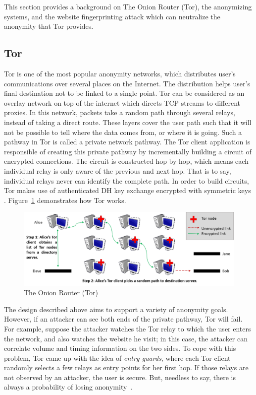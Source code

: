 
This section provides a background on The Onion Router (Tor), the anonymizing systems, and the website fingerprinting attack which can neutralize the anonymity that Tor provides.

\subsection{Tor}

Tor is one of the most popular anonymity networks, which distributes user's communications over several places on the Internet.
The distribution helps user's final destination not to be linked to a single point. Tor can be considered as an overlay network on top of the internet which directs TCP streams to different proxies.
In this network, packets take a random path through several relays, instead of taking a direct route.
These layers cover the user path such that it will not be possible to tell where the data comes from, or where it is going.
Such a pathway in Tor is called a private network pathway.
The Tor client application is responsible of creating this private pathway by incrementally building a circuit of encrypted connections.
The circuit is constructed hop by hop, which means each individual relay is only aware of the previous and next hop.
That is to say, individual relays never can identify the complete path. In order to build circuits, Tor makes use of authenticated DH key exchange encrypted with symmetric keys \cite{TorPage, dingledine2004tor}. Figure~\ref{fig:tor} demonstrates how Tor works.

\begin{figure}[h]
\includegraphics[width=1\columnwidth]{figures/tor.png}
\centering
\caption{The Onion Router (Tor)~\cite{TorPage}}
\label{fig:tor}
\end{figure}

The design described above aims to support a variety of anonymity goals. However, if an attacker can see both ends of the private pathway, Tor will fail.
For example, suppose the attacker watches the Tor relay to which the user enters the network, and also watches the website he visit; in this case, the attacker can correlate volume and timing information on the two sides.
To cope with this problem, Tor came up with the idea of {\it entry guards}, where each Tor client randomly selects a few relays as entry points for her first hop.
If those relays are not observed by an attacker, the user is secure.
But, needless to say, there is always a probability of losing anonymity~\cite{TorPage}.

